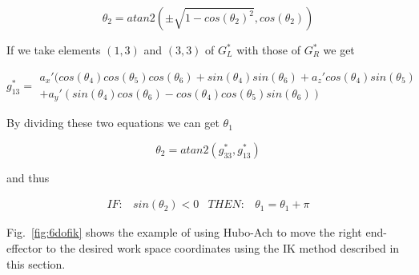 \begin{equation}
\theta_2 = atan2(\pm \sqrt{1-cos(\theta_2)^2}, cos(\theta_2))
\end{equation}

If we take elements $(1,3)$ and $(3,3)$ of $G^*_L$ with those of $G^*_R$ we get

\begin{equation}
g^*_{13} = \begin{array}{l} a_x'( cos(\theta_4)cos(\theta_5)cos(\theta_6) + sin(\theta_4)sin(\theta_6) + a_z'cos(\theta_4)sin(\theta_5) \\
+ a_y'(sin(\theta_4)cos(\theta_6)-cos(\theta_4)cos(\theta_5)sin(\theta_6))
\end{array}
\end{equation}

By dividing these two equations we can get $\theta_1$

\begin{equation}
\theta_2 = atan2(g^*_{33}, g^*_{13})
\end{equation}

and thus

\begin{equation}
\begin{array}{rcrc}IF:& sin(\theta_2)<0 & THEN: & \theta_1 = \theta_1 + \pi
\end{array}
\end{equation}

Fig.~\ref{fig:6dofik} shows the example of using Hubo-Ach to move the right end-effector to the desired work space coordinates using the IK method described in this section.

